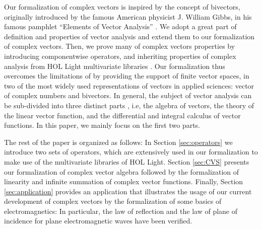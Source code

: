 \documentclass{llncs}
\begin{document}
Our formalization of complex vectors is inspired by the concept of bivectors, originally introduced by the famous American physicist J. William Gibbs, in his famous pamphlet ``Elements of Vector Analysis'' \cite{gibbs_1884}. We adopt a great part of definition and properties of vector analysis and extend them to our formalization of complex vectors. Then, we prove many of complex vectors properties by introducing componentwise operators, and inheriting properties of complex analysis from HOL Light multivariate libraries \cite{harrison_07}. Our formalization thus overcomes the limitations of \cite{NFMYousri} by providing the support of finite vector spaces, in two of the most widely used representations of vectors in applied sciences: vector of complex numbers and bivectors. 
In general, the subject of vector analysis can be sub-divided into three distinct parts \cite{gibbs_1884}, i.e, the algebra of vectors, the theory of the linear vector function, and the differential and integral calculus of vector functions. In this paper, we mainly focus on the first two parts. 



The rest of the paper is organized as follows: In Section \ref{sec:operators} we introduce two sets of operators, which are extensively used in our formalization to make use of the multivariate libraries of HOL Light. Section \ref{sec:CVS} presents
  our formalization of complex vector algebra followed by the formalization of linearity and infinite summation of complex vector functions. Finally, Section \ref{sec:application} provides an application that illustrates the usage of our current development of complex vectors by 
  the formalization of some basics of electromagnetics: In particular, the law of reflection and the law of plane of incidence for plane electromagnetic waves have been verified.
   
\end{document}

